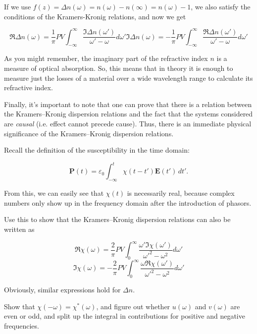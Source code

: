 If we use $f(z)= \Delta n(\omega) = n(\omega) - n(\infty) = n(\omega) - 1$, we also satisfy the conditions of the Kramers-Kronig relations, and now we get

\begin{subequations} 
  \begin{equation}
  \Re \Delta n(\omega) = \frac{1}{\pi} PV \int_{- \infty}^{\infty} \frac{\Im
  \Delta n(\omega')}{\omega'-\omega}d\omega'
  \end{equation} 
  \begin{equation}
  \Im \Delta n(\omega) = -\frac{1}{\pi} PV \int_{- \infty}^{\infty} \frac{\Re
  \Delta n (\omega')}{\omega'-\omega}d\omega'
  \end{equation}
  \label{eq-KK-3}
  \end{subequations}

As you might remember, the imaginary part of the refractive index $n$ is a measure of optical absorption. So, this means that in theory it is enough to measure just the losses of a material over a wide wavelength range to calculate its refractive index.

Finally, it's important to note that one can prove that there is a relation between the Kramers--Kronig dispersion relations and the fact that the systems considered are \emph{causal} (i.e. effect cannot precede cause)\noindent{}. Thus, there is an immediate physical significance of the Kramers--Kronig dispersion relations.

\begin{exer}

Recall the definition of the susceptibility in the time domain:

\begin{equation}
\mathbf{P}(t)=\varepsilon_0 \int_{-\infty}^t \chi(t-t') \mathbf{E}(t')\, dt'.
\end{equation}

From this, we can easily see that $\chi(t)$ is necessarily real, because complex numbers only show up in the frequency domain after the introduction of phasors. 

Use this to show that the Kramers--Kronig dispersion relations can also be written as

$$\Re \chi(\omega) =  \frac{2}{\pi} PV \int_{0}^{\infty}{ \frac{\omega'\Im \chi(\omega')}{\omega'^2-\omega^2}d\omega'}$$
$$\Im \chi(\omega) = -\frac{2}{\pi} PV \int_{0}^{\infty}{ \frac{\omega \Re \chi(\omega')}{\omega'^2-\omega^2}d\omega'}$$

Obviously, similar expressions hold for $\Delta n$.

  \begin{hnt}
    Show that $\chi(-\omega) = \chi^*(\omega)$, and figure out whether $u(\omega)$ and $v(\omega)$ are even or odd, and split up the integral in contributions for positive and negative frequencies.
  \end{hnt}
\end{exer}

